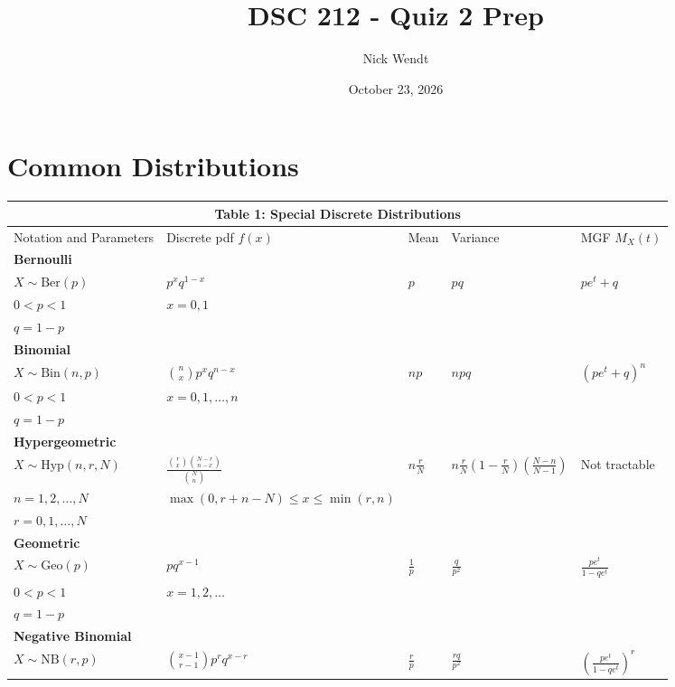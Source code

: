 \documentclass{article}
\title{DSC 212 - Quiz 2 Prep}
\author{Nick Wendt}
\date{October 23, 2026}
\begin{document}
\maketitle

\section*{Common Distributions}
\begin{center}
\renewcommand{\arraystretch}{1.15}
\small
\begin{tabular}{lllll}
\multicolumn{5}{c}{\textbf{Table 1: Special Discrete Distributions}} \\[0.5em]
\toprule
Notation and Parameters & Discrete pdf $f(x)$ & Mean & Variance & MGF $M_X(t)$ \\
\midrule
\textbf{Bernoulli} & & & & \\
\quad $X \sim \text{Ber}(p)$ & $p^x q^{1-x}$ & $p$ & $pq$ & $pe^t + q$ \\
\quad $0 < p < 1$ & $x = 0, 1$ & & & \\
\quad $q = 1 - p$ & & & & \\
\midrule
\textbf{Binomial} & & & & \\
\quad $X \sim \text{Bin}(n, p)$ & $\binom{n}{x} p^x q^{n-x}$ & $np$ & $npq$ & $(pe^t + q)^n$ \\
\quad $0 < p < 1$ & $x = 0, 1, \dots, n$ & & & \\
\quad $q = 1 - p$ & & & & \\
\midrule
\textbf{Hypergeometric} & & & & \\
\quad $X \sim \text{Hyp}(n, r, N)$ & $\frac{\binom{r}{x}\binom{N-r}{n-x}}{\binom{N}{n}}$ & $n\frac{r}{N}$ & $n\frac{r}{N}\left(1 - \frac{r}{N}\right)\left(\frac{N-n}{N-1}\right)$ & Not tractable \\
\quad $n = 1, 2, \dots, N$ & $\max(0, r+n-N) \le x \le \min(r, n)$ & & & \\
\quad $r = 0, 1, \dots, N$ & & & & \\
\midrule
\textbf{Geometric} & & & & \\
\quad $X \sim \text{Geo}(p)$ & $pq^{x-1}$ & $\frac{1}{p}$ & $\frac{q}{p^2}$ & $\frac{pe^t}{1 - qe^t}$ \\
\quad $0 < p < 1$ & $x = 1, 2, \dots$ & & & \\
\quad $q = 1 - p$ & & & & \\
\midrule
\textbf{Negative Binomial} & & & & \\
\quad $X \sim \text{NB}(r, p)$ & $\binom{x-1}{r-1} p^r q^{x-r}$ & $\frac{r}{p}$ & $\frac{rq}{p^2}$ & $\left(\frac{pe^t}{1 - qe^t}\right)^r$ \\

\end{tabular}
\end{center}
\end{document}
